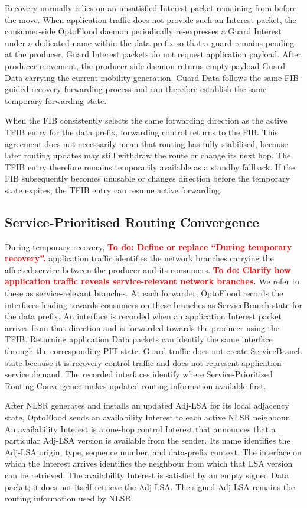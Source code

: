 \documentclass[10pt,conference]{IEEEtran}
\newcommand{\todo}[1]{\textbf{\textcolor{red}{To do: #1}}}
\begin{document}
Recovery normally relies on an unsatisfied Interest packet remaining from before the move. When application traffic does not provide such an Interest packet, the consumer-side OptoFlood daemon periodically re-expresses a Guard Interest under a dedicated name within the data prefix so that a guard remains pending at the producer. Guard Interest packets do not request application payload. After producer movement, the producer-side daemon returns empty-payload Guard Data carrying the current mobility generation. Guard Data follows the same FIB-guided recovery forwarding process and can therefore establish the same temporary forwarding state.

When the FIB consistently selects the same forwarding direction as the active TFIB entry for the data prefix, forwarding control returns to the FIB. This agreement does not necessarily mean that routing has fully stabilised, because later routing updates may still withdraw the route or change its next hop. The TFIB entry therefore remains temporarily available as a standby fallback. If the FIB subsequently becomes unusable or changes direction before the temporary state expires, the TFIB entry can resume active forwarding.

\subsection{Service-Prioritised Routing Convergence}
\label{sec:design:sprc}

During temporary recovery, \todo{Define or replace ``During temporary recovery''.} application traffic identifies the network branches carrying the affected service between the producer and its consumers. \todo{Clarify how application traffic reveals service-relevant network branches.} We refer to these as service-relevant branches. At each forwarder, OptoFlood records the interfaces leading towards consumers on these branches as ServiceBranch state for the data prefix. An interface is recorded when an application Interest packet arrives from that direction and is forwarded towards the producer using the TFIB. Returning application Data packets can identify the same interface through the corresponding PIT state. Guard traffic does not create ServiceBranch state because it is recovery-control traffic and does not represent application-service demand. The recorded interfaces identify where Service-Prioritised Routing Convergence makes updated routing information available first.

After NLSR generates and installs an updated Adj-LSA for its local adjacency state, OptoFlood sends an availability Interest to each active NLSR neighbour. An availability Interest is a one-hop control Interest that announces that a particular Adj-LSA version is available from the sender. Its name identifies the Adj-LSA origin, type, sequence number, and data-prefix context. The interface on which the Interest arrives identifies the neighbour from which that LSA version can be retrieved. The availability Interest is satisfied by an empty signed Data packet; it does not itself retrieve the Adj-LSA. The signed Adj-LSA remains the routing information used by NLSR.
\end{document}
